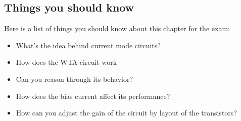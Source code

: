 \subsection{Things you should know}

Here is a list of things you should know about this chapter for the exam: 

\begin{itemize}
    \item What's the idea behind current mode circuits?
    \item How does the WTA circuit work
    \item Can you reason through its behavior? 
    \item How does the bias current affect its performance?
    \item How can you adjust the gain of the circuit by layout of the transistors?
\end{itemize}